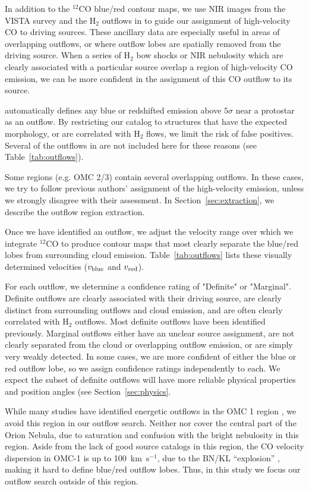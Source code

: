 \documentclass[twocolumn]{aastex63}
\newcommand{\co}[1][]{\ensuremath{^{#1}}CO}
\begin{document}
In addition to the \co[12]{} blue/red contour maps, we use NIR images from the VISTA survey \citep{Meingast16} and the H$_2$ outflows in \citet{Davis09} to guide our assignment of high-velocity CO to driving sources. These ancillary data are especially useful in areas of overlapping outflows, or where outflow lobes are spatially removed from the driving source. When a series of H$_2$ bow shocks or NIR nebulosity which are clearly associated with a particular source overlap a region of high-velocity CO emission, we can be more confident in the assignment of this CO outflow to its source.

\citet{Tanabe:submitted} automatically defines any blue or redshifted emission above $5\sigma$ near a protostar as an outflow. By restricting our catalog to structures that have the expected morphology, or are correlated with H$_2$ flows, we limit the risk of false positives. Several of the outflows in \citet{Tanabe:submitted} are not included here for these reasons (see Table~\ref{tab:outflows}).

Some regions (e.g. OMC 2/3) contain several overlapping outflows. In these cases, we try to follow previous authors' assignment of the high-velocity emission, unless we strongly disagree with their assessment. In Section~\ref{sec:extraction}, we describe the outflow region extraction.

Once we have identified an outflow, we adjust the velocity range over which we integrate \co[12]{} to produce contour maps that most clearly separate the blue/red lobes from surrounding cloud emission. Table~\ref{tab:outflows} lists these visually determined velocities ($v_{\rm blue}$ and $v_{\rm red}$).

For each outflow, we determine a confidence rating of "Definite" or "Marginal". Definite outflows are clearly associated with their driving source, are clearly distinct from surrounding outflows and cloud emission, and are often clearly correlated with H$_2$ outflows. Most definite outflows have been identified previously. Marginal outflows either have an unclear source assignment, are not clearly separated from the cloud or overlapping outflow emission, or are simply very weakly detected. In some cases, we are more confident of either the blue or red outflow lobe, so we assign confidence ratings independently to each. We expect the subset of definite outflows will have more reliable physical properties and position angles (see Section~\ref{sec:physics}.

While many studies have identified energetic outflows in the OMC 1 region \citep[e.g.][]{Schmid-Burgk90,Zapata05,Teixeira16,Bally17}, we avoid this region in our outflow search. Neither \citet{Davis09} nor \citet{Furlan16} cover the central part of the Orion Nebula, due to saturation and confusion with the bright nebulosity in this region. Aside from the lack of good source catalogs in this region, the CO velocity dispersion in OMC-1 is up to 100~km~s$^{-1}$, due to the BN/KL ``explosion'' \citep{Bally17}, making it hard to define blue/red outflow lobes. Thus, in this study we focus our outflow search outside of this region. 
\end{document}
